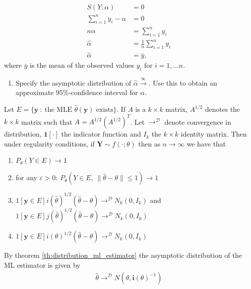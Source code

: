 \begin{align*}
    S\left(Y; \alpha \right) &= 0\\
    \sum_{i=1}^n y_i - \alpha &= 0\\
    n\alpha &= \sum_{i=1}^n y_i\\
    \hat{\alpha} &= \frac{1}{n} \sum_{i=1}^n y_i \\
    \hat{\alpha} &= \bar{y},
\end{align*}
where $\bar{y}$ is the mean of the observed values $y_i$ for $i = 1, \ldots n$.

\begin{enumerate}[resume]
    \item  Specify the asymptotic distribution of $\hat{\alpha}\xrightarrow \infty$. Use this to obtain an approximate $95\%$-confidence interval for $\alpha$.
\end{enumerate}

\begin{theorem}\label{th:distribution_ml_estimator}
Let $E = \{\mathbf{y} \ : \ \text{the MLE } \hat{\theta}(\mathbf{y}) \text{ exists}\}$. 
If $A$ is a $k \times k$ matrix, $A^{1/2}$ denotes the $k \times k$ matrix such that $A = A^{1/2}\left( A^{1/2} \right)^T$.
Let $\rightarrow^\mathcal{D}$ denote convergence in distribution, $\mathbf{1}[\cdot]$ the indicator function and $I_k$ the $k \times k$ identity matrix.
Then under regularity conditions, if $\mathbf{Y} \sim f(\cdot;\theta)$ then as $n \rightarrow \infty$ we have that
\begin{enumerate}
    \item $P_\theta(Y \in E) \rightarrow 1$
    \item for any $\varepsilon > 0: \ P_\theta(Y \in E, \ \|\hat{\theta} - \theta\| \leq 1) \rightarrow 1$
    \item $1[\mathbf{y} \in E] i(\hat{\theta})^{1/2}(\hat{\theta} - \theta) \rightarrow^\mathcal{D} N_k(0, I_k)$ and $1[\mathbf{y} \in E] j(\hat{\theta})^{1/2}(\hat{\theta} - \theta) \rightarrow^\mathcal{D} N_k(0, I_k)$
    \item $1[\mathbf{y} \in E] i(\theta)^{1/2}(\hat{\theta} - \theta) \rightarrow^\mathcal{D} N_k(0, I_k)$
\end{enumerate}
\end{theorem}


By theorem \ref{th:distribution_ml_estimator} the asymptotic distribution of the ML estimator is given by
\begin{align*}
    \hat{\theta} \rightarrow^\mathcal{D} N\left( \theta, \boldsymbol{i}(\theta)^{-1} \right)
\end{align*}

